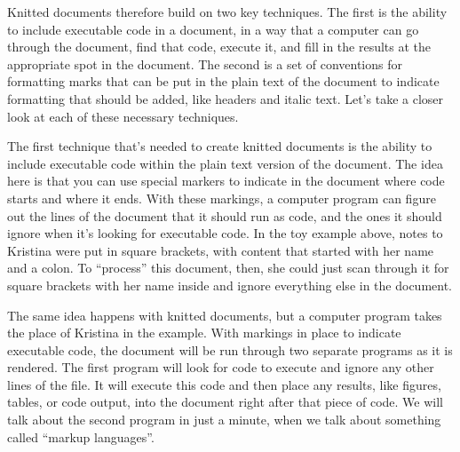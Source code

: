 \documentclass[]{tufte-book}
\begin{document}
Knitted documents therefore build on two key techniques. The first is the
ability to include executable code in a document, in a way that a computer can
go through the document, find that code, execute it, and fill in the results at
the appropriate spot in the document. The second is a set of conventions for
formatting marks that can be put in the plain text of the document to indicate
formatting that should be added, like headers and italic text. Let's take a closer
look at each of these necessary techniques.

The first technique that's needed to create knitted documents is the ability to
include executable code within the plain text version of the document.
The idea here is that you can use special markers to indicate in the document
where code starts and where it ends. With these markings, a computer program can
figure out the lines of the document that it should run as code, and the ones it
should ignore when it's looking for executable code. In the toy example above,
notes to Kristina were put in square brackets, with content that started with
her name and a colon. To ``process'' this document, then, she could just scan
through it for square brackets with her name inside and ignore everything else
in the document.

The same idea happens with knitted documents, but a computer program takes the
place of Kristina in the example. With markings in place to indicate executable
code, the document will be run through two separate programs as it is rendered.
The first program will look for code to execute and ignore any other lines of
the file. It will execute this code and then place any results, like figures,
tables, or code output, into the document right after that piece of code. We
will talk about the second program in just a minute, when we talk about
something called ``markup languages''.
\end{document}
